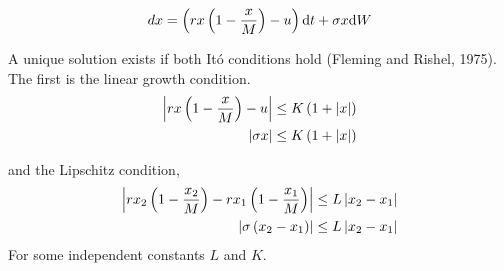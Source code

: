\begin{equation}
	dx=\left(rx\left(1-\frac{x}{M}\right)-u\right)\mathrm{d} t+\sigma x\mathrm{d} W
\end{equation}

A unique solution exists if both It\'o conditions hold (Fleming and Rishel, 1975). The first is the linear growth condition.
\begin{align}
	\left|rx\left(1-\frac{x}{M}\right)-u\right|&\leq K\left(1+\left|x\right|\right) \\
	\left|\sigma x\right|&\leq K\left(1+\left|x\right|\right)
\end{align}

and the Lipschitz condition,
\begin{align}
\left|rx_2\left(1-\frac{x_2}{M}\right)-rx_1\left(1-\frac{x_1}{M}\right)\right|&\leq L \left|x_2-x_1\right|\\
\left|\sigma\left(x_2-x_1\right)\right| &\leq L \left|x_2-x_1\right|
\end{align}
For some independent constants $L$ and $K$.